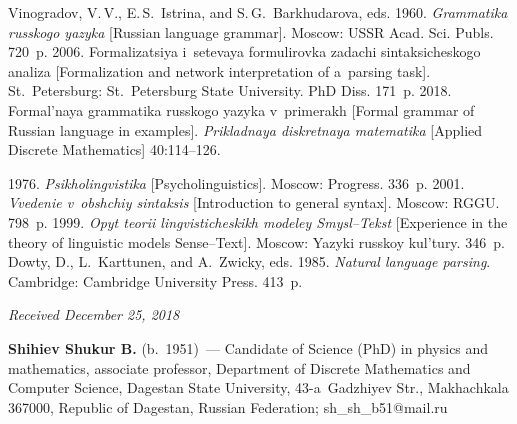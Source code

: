   \begin{multicols}{2}

\renewcommand{\bibname}{\protect\rmfamily References}

{\small\frenchspacing
 {%
 \begin{thebibliography}{9}
Vinogradov, V.\,V., E.\,S.~Istrina, and S.\,G.~Barkhudarova, eds. 1960. \textit{Grammatika 
russkogo yazyka} [Russian language grammar]. Moscow: USSR Acad. Sci. Publs. 720~p.
 2006. Formalizatsiya i~setevaya formulirovka zadachi 
sintaksicheskogo analiza [Formalization and network interpretation of 
a~parsing task].  
St.\ Petersburg: St.\ Petersburg State University. PhD Diss. 171~p.
 2018. Formal'naya grammatika russkogo 
yazyka v~primerakh [Formal grammar of Russian language in examples]. 
\textit{Prikladnaya diskretnaya matematika} [Applied Discrete Mathematics] 40:114--126.
{

}
 1976. \textit{Psikholingvistika} [Psycholinguistics]. 
Moscow: Progress. 336~p.
 2001. \textit{Vvedenie v~obshchiy sintaksis} [Introduction to 
general syntax]. Moscow: RGGU. 798~p.
 1999. \textit{Opyt teorii lingvisticheskikh modeley Smysl--Tekst} 
[Experience in the theory of linguistic models Sense--Text]. Moscow: Yazyki russkoy 
kul'tury. 346~p.
Dowty, D., L.~Karttunen, and A.~Zwicky, eds. 1985. \textit{Natural language parsing}. 
Cambridge: Cambridge University Press. 413~p.

\end{thebibliography}

 }
 }

\end{multicols}

\vspace*{-6pt}

\hfill{\small\textit{Received December 25, 2018}}



\Contr


\noindent
\textbf{Shihiev Shukur B.} (b.\ 1951)~--- Candidate of Science (PhD) in physics and 
mathematics, associate professor, Department of Discrete Mathematics and Computer Science, 
Dagestan State University, 43-a~Gadzhiyev Str., Makhachkala 367000, Republic of Dagestan, 
Russian Federation; \mbox{sh\_sh\_b51@mail.ru}

